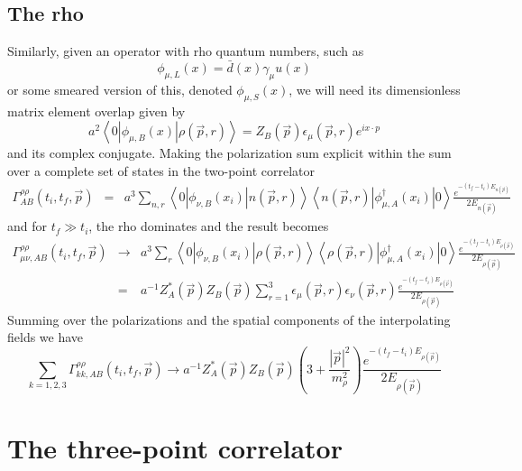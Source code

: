 \documentclass[12pt]{article}
\begin{document}
\subsection{The rho}
Similarly, given an operator with rho quantum numbers, such as
\[
\phi_{\mu,L}(x) = \bar{d}(x)\gamma_\mu u(x)
\]
or some smeared version of this, denoted $\phi_{\mu,S}(x)$, we
will need its dimensionless matrix element overlap given by
\[
a^2\left<0\left|\phi_{\mu,B}(x)\right|\rho(\vec{p},r)\right> 
  = Z_B(\vec{p})\epsilon_\mu(\vec{p},r) e^{i x\cdot p}
\]
and its complex conjugate.
Making the polarization sum explicit within the sum over a complete set of
states in the two-point correlator
\begin{eqnarray*}
\Gamma^{\rho\rho}_{AB}(t_i,t_f,\vec{p})
 &=& a^3\sum_{n,r}\left<0\left|\phi_{\nu,B}(x_i)\right|n(\vec{p},r)\right>
     \left<n(\vec{p},r)\left|\phi_{\mu,A}^\dagger(x_i)\right|0\right>
     \frac{e^{-(t_f-t_i)E_{n(\vec{p})}}}{2E_{n(\vec{p})}}
\end{eqnarray*}
and for $t_f\gg t_i$, the rho dominates and the result becomes
\begin{eqnarray*}
\Gamma^{\rho\rho}_{\mu\nu,AB}(t_i,t_f,\vec{p}) &\to&
     a^3\sum_r\left<0\left|\phi_{\nu,B}(x_i)\right|\rho(\vec{p},r)\right>
     \left<\rho(\vec{p},r)\left|\phi_{\mu,A}^\dagger(x_i)\right|0\right>
     \frac{e^{-(t_f-t_i)E_{\rho(\vec{p})}}}{2E_{\rho(\vec{p})}} \\
 &=& a^{-1} Z_A^{\ast}(\vec{p}) Z_B(\vec{p})
     \sum_{r=1}^3\epsilon_\mu(\vec{p},r)
     \epsilon_\nu(\vec{p},r)
     \frac{e^{-(t_f-t_i)E_{\rho(\vec{p})}}}{2E_{\rho(\vec{p})}}
\end{eqnarray*}
Summing over the polarizations and the spatial components of the interpolating fields
we have
\[
\sum_{k=1,2,3}\Gamma^{\rho\rho}_{kk,AB}(t_i,t_f,\vec{p}) \to
 a^{-1} Z_A^{\ast}(\vec{p}) Z_B(\vec{p})
     \left(3+\frac{|\vec{p}|^2}{m_\rho^2}\right)
     \frac{e^{-(t_f-t_i)E_{\rho(\vec{p})}}}{2E_{\rho(\vec{p})}}
\]


\section{The three-point correlator}
\end{document}
